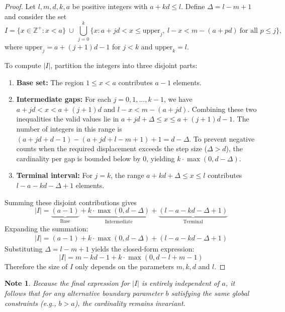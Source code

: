 \documentclass[12pt, english, a4paper]{article}
\theoremstyle{plain}
\newtheorem{note}{Note}
\theoremstyle{definition}
\theoremstyle{remark}
\begin{document}
\begin{proof}

Let \(l,m,d,k,a\) be positive integers with \(a+kd \le l\). Define 
\(\Delta=l-m+1\) and consider the set
\[
I=\{x\in \mathbb{Z}^+ : x<a\}\ \cup\ 
\bigcup_{j=0}^{k}\{x: a+jd<x\le \text{upper}_j,\ 
l-x<m-(a+pd)\ \text{for all }p\le j\},
\]
where \(\text{upper}_j=a+(j+1)d-1\) for \(j<k\) and 
\(\text{upper}_k=l\).

To compute \(|I|\), partition the integers into three disjoint parts: 
\begin{enumerate}
     \item[(i)] \textbf{Base set:} The region \(1\le x<a\) contributes \(a-1\) elements. 
    \item[(ii)] \textbf{Intermediate gaps:}  For each \(j=0,1,\ldots ,k-1\), we have $a+jd<x<a+(j+1)d$ and $l-x<m-(a+jd)$. Combining these two inequalities the valid values lie in $a+jd+\Delta \le x \le a+(j+1)d-1$.
    The number of integers in this range is $ (a + jd + d - 1) - (a + jd + l - m + 1) + 1=d-\Delta$.
 To prevent negative counts when the required displacement exceeds the step size ($\Delta > d$), the cardinality per gap is bounded below by $0$, yielding $k \cdot \max(0, d - \Delta)$.
    \item[(iii)] \textbf{Terminal interval:} For \(j=k\), the range 
\(a+kd+\Delta \le x \le l\) contributes 
\(l-a-kd-\Delta+1\) elements.
\end{enumerate}
Summing these disjoint contributions gives
\begin{equation*}
|I| = \underbrace{(a - 1)}_{\text{Base}} + \underbrace{k \cdot \max(0, d - \Delta)}_{\text{Intermediate}} + \underbrace{(l - a - kd - \Delta + 1)}_{\text{Terminal}}
\end{equation*}
Expanding the summation:
\begin{align*}
|I| = (a - 1) + k \cdot \max(0, d - \Delta) + (l - a - kd - \Delta + 1)
\end{align*}
Substituting $\Delta = l - m + 1$ yields the closed-form expression:
\begin{equation*}
|I| = m - kd - 1 + k \cdot \max(0, d - l + m - 1)
\end{equation*}
Therefore the size of $I$ only depends on the parameters $m,k,d$ and $l$.
\end{proof}
\begin{note}
    Because the final expression for $|I|$ is entirely independent of $a$, it follows that for any alternative boundary parameter $b$ satisfying the same global constraints (e.g., $b > a$), the cardinality remains invariant.
\end{note}
\end{document}
